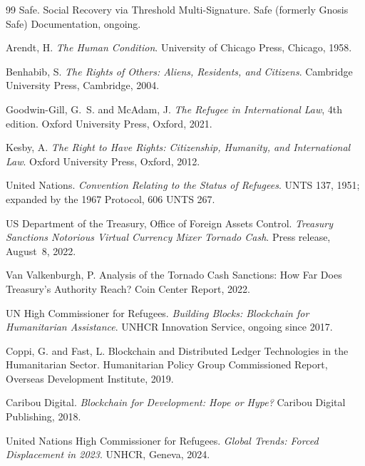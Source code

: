 \documentclass[11pt,a4paper]{article}
\theoremstyle{remark}
\begin{document}
\begin{thebibliography}{99}
Safe.
\newblock Social Recovery via Threshold Multi-Signature.
\newblock Safe (formerly Gnosis Safe) Documentation, ongoing.

Arendt, H.
\newblock \emph{The Human Condition}.
\newblock University of Chicago Press, Chicago, 1958.

Benhabib, S.
\newblock \emph{The Rights of Others: Aliens, Residents, and
  Citizens}.
\newblock Cambridge University Press, Cambridge, 2004.

Goodwin-Gill, G.~S. and McAdam, J.
\newblock \emph{The Refugee in International Law}, 4th edition.
\newblock Oxford University Press, Oxford, 2021.

Kesby, A.
\newblock \emph{The Right to Have Rights: Citizenship, Humanity, and
  International Law}.
\newblock Oxford University Press, Oxford, 2012.

United Nations.
\newblock \emph{Convention Relating to the Status of Refugees}.
 UNTS 137, 1951; expanded by the 1967 Protocol,
  606 UNTS 267.

US Department of the Treasury, Office of Foreign Assets Control.
\newblock \emph{Treasury Sanctions Notorious Virtual Currency
  Mixer Tornado Cash}.
\newblock Press release, August~8, 2022.

Van Valkenburgh, P.
\newblock Analysis of the Tornado Cash Sanctions: How Far Does
  Treasury's Authority Reach?
\newblock Coin Center Report, 2022.

UN High Commissioner for Refugees.
\newblock \emph{Building Blocks: Blockchain for Humanitarian
  Assistance}.
\newblock UNHCR Innovation Service, ongoing since 2017.

Coppi, G. and Fast, L.
\newblock Blockchain and Distributed Ledger Technologies in the
  Humanitarian Sector.
\newblock Humanitarian Policy Group Commissioned Report, Overseas
  Development Institute, 2019.

Caribou Digital.
\newblock \emph{Blockchain for Development: Hope or Hype?}
\newblock Caribou Digital Publishing, 2018.

United Nations High Commissioner for Refugees.
\newblock \emph{Global Trends: Forced Displacement in 2023}.
\newblock UNHCR, Geneva, 2024.

\end{thebibliography}
\end{document}
